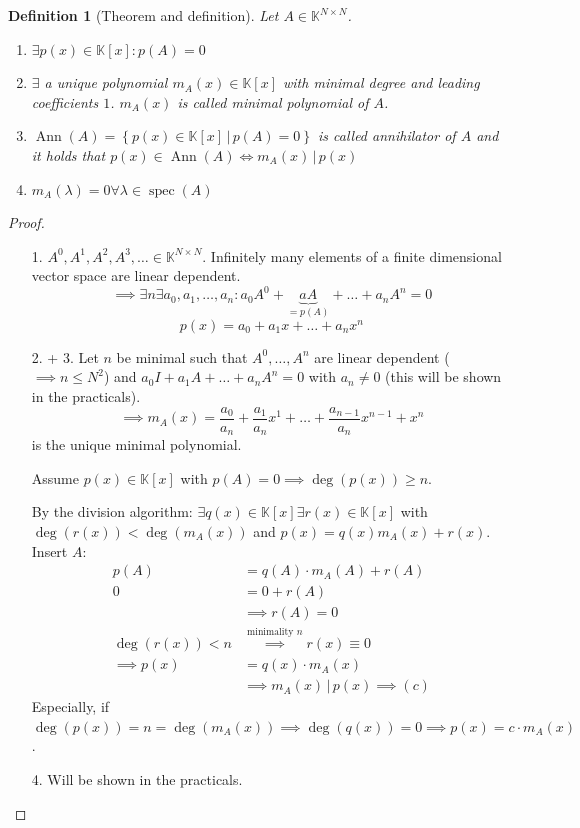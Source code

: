\documentclass[a4paper]{article}
\newcounter{lecref}[section]
\numberwithin{lecref}{section}
\newtheorem{definition}[lecref]{Definition}
\newcommand{\setdef}[2]{\left\{\left.#1\,\right|\,#2\right\}}
\newcommand{\divides}{\,\big|\,} %
\begin{document}
\begin{definition}[Theorem and definition] %
  Let $A \in \mathbb K^{N \times N}$.
  \begin{enumerate}
    \item $\exists p(x) \in \mathbb K[x]: p(A) = 0$
    \item $\exists$ a unique polynomial $m_A(x) \in \mathbb K[x]$ with minimal degree and leading coefficients $1$.
      $m_A(x)$ is called \emph{minimal polynomial of $A$}.
    \item $\operatorname{Ann}(A) = \setdef{p(x) \in \mathbb K[x]}{p(A) = 0}$ is called \emph{annihilator of $A$}
      and it holds that $p(x) \in \operatorname{Ann}(A) \iff m_A(x) \divides{} p(x)$
    \item $m_A(\lambda) = 0 \forall \lambda \in \operatorname{spec}(A)$
  \end{enumerate}
\end{definition}

\begin{proof}
  \begin{enumerate}
    \item[1.] $A^0, A^1, A^2, A^3, \dots \in \mathbb K^{N \times N}$.
      Infinitely many elements of a finite dimensional vector space are linear dependent.
      \[ \implies \exists n \exists a_0, a_1, \dots, a_n: a_0 A^0 + \underbrace{a A}_{= p(A)} + \dots + a_n A^n = 0 \]
      \[ p(x) = a_0 + a_1 x + \dots + a_n x^n \]
    \item[2. + 3.]
      Let $n$ be minimal such that $A^0, \dots, A^n$ are linear dependent ($\implies n \leq N^2$) and $a_0 I + a_1 A + \dots + a_n A^n = 0$ with $a_n \neq 0$ (this will be shown in the practicals).
      \[ \implies m_A(x) = \frac{a_0}{a_n} + \frac{a_1}{a_n} x^1 + \dots + \frac{a_{n-1}}{a_n} x^{n-1} + x^n \]
      is the unique minimal polynomial.

      Assume $p(x) \in \mathbb K[x]$ with $p(A) = 0 \implies \deg(p(x)) \geq n$.

      By the division algorithm: $\exists q(x) \in \mathbb K[x] \exists r(x) \in \mathbb K[x]$ with $\deg(r(x)) < \deg(m_A(x))$ and $p(x) = q(x) m_A(x) + r(x)$. Insert $A$:
      \begin{align*}
        p(A) &= q(A) \cdot m_A(A) + r(A) \\
        0 &= 0 + r(A) \\
        & \implies r(A) = 0 \\
        \deg(r(x)) < n & \overset{\text{minimality $n$}}\implies r(x) \equiv 0 \\
        \implies p(x) &= q(x) \cdot m_A(x) \\
          & \implies m_A(x) \divides{} p(x) \implies (c)
      \end{align*}
      Especially, if $\deg(p(x)) = n = \deg(m_A(x)) \implies \deg(q(x)) = 0 \implies p(x) = c \cdot m_A(x)$.
    \item[4.] Will be shown in the practicals.
  \end{enumerate}
\end{proof}
\end{document}
